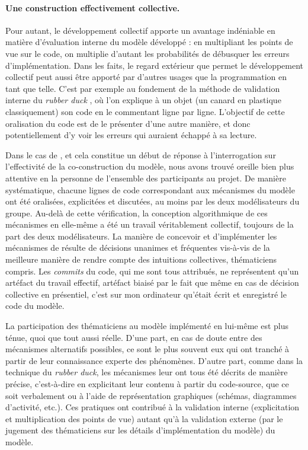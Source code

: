 \paragraph{Une construction effectivement collective.}
Pour autant, le développement collectif apporte un avantage indéniable en matière d'évaluation interne du modèle développé : en multipliant les points de vue sur le code, on multiplie d'autant les probabilités de débusquer les erreurs d'implémentation.
Dans les faits, le regard extérieur que permet le développement collectif peut aussi être apporté par d'autres usages que la programmation en tant que telle.
C'est par exemple au fondement de la méthode de validation interne du \og \textit{rubber duck}\fg{} \autocite{noauthor_methode_2019}, où l'on explique à un objet (un \og canard en plastique\fg{} classiquement) son code en le commentant ligne par ligne.
L'objectif de cette oralisation du code est de le présenter d'une autre manière, et donc potentiellement d'y voir les erreurs qui auraient échappé à sa \og lecture\fg{}.

Dans le cas de \simfeodal{}, et cela constitue un début de réponse à l'interrogation sur l'effectivité de la co-construction du modèle, nous avons trouvé oreille bien plus attentive en la personne de l'ensemble des participants au projet.
De manière systématique, chacune lignes de code correspondant aux mécanismes du modèle ont été oralisées, explicitées et discutées, au moins par les deux \og modélisateurs\fg{} du groupe.
Au-delà de cette vérification, la conception algorithmique de ces mécanismes en elle-même a été un travail véritablement collectif, toujours de la part des deux modélisateurs.
La manière de concevoir et d'implémenter les mécanismes de \simfeodal{} résulte de décisions unanimes et fréquentes vis-à-vis de la meilleure manière de rendre compte des intuitions collectives, thématiciens compris.
Les \textit{commits} du code, qui me sont tous attribués, ne représentent qu'un artéfact du travail effectif, artéfact biaisé par le fait que même en cas de décision collective en présentiel, c'est sur mon ordinateur qu'était écrit et enregistré le code du modèle.

La participation des thématiciens au modèle implémenté en lui-même est plus ténue, quoi que tout aussi réelle.
D'une part, en cas de doute entre des mécanismes alternatifs possibles, ce sont le plus souvent eux qui ont tranché à partir de leur connaissance experte des phénomènes.
D'autre part, comme dans la technique du \textit{rubber duck}, les mécanismes leur ont tous été décrits de manière précise, c'est-à-dire en explicitant leur contenu à partir du code-source, que ce soit verbalement ou à l'aide de représentation graphiques (schémas, diagrammes d'activité, etc.).
Ces pratiques ont contribué à la validation interne (explicitation et multiplication des points de vue) autant qu'à la validation externe (par le jugement des thématiciens sur les détails d'implémentation du modèle) du modèle.


